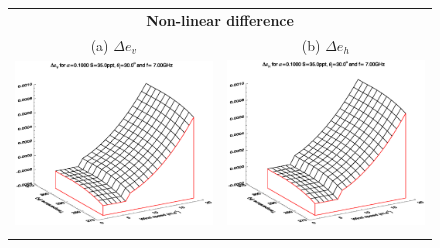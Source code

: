 \begin{figure}[htp]
  \centering
  \begin{tabular}{c c}
    \multicolumn{2}{c}{\sffamily\textbf{Non-linear difference}}\\
    \textsf{(a)} $\Delta e_v$ &
    \textsf{(b)} $\Delta e_h$ \\
    \includegraphics[bb=110 240 508 540,clip,scale=0.5]{graphics/Model/FWDTL/Initial/FWDdev_a0.1000_s35.0ppt_z30.0_7.00GHz.eps} &
    \includegraphics[bb=110 240 508 540,clip,scale=0.5]{graphics/Model/FWDTL/Initial/FWDdeh_a0.1000_s35.0ppt_z30.0_7.00GHz.eps} \\\\

\end{tabular}
\end{figure}
